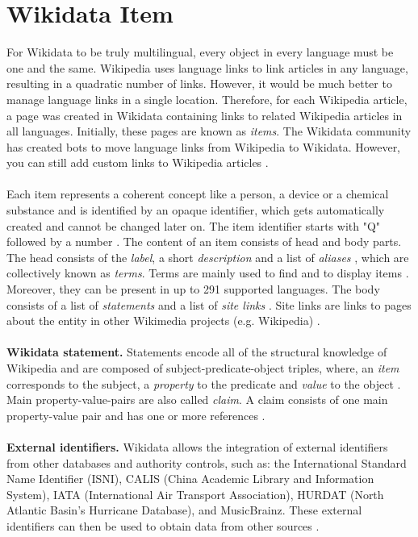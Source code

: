 ﻿\documentclass[11pt,titlepage,oneside,openany]{book}
\begin{document}
\section{Wikidata Item}
For Wikidata to be truly multilingual, every object in every language must be one and the same. Wikipedia uses language links to link articles in any language, resulting in a quadratic number of links. However, it would be much better to manage language links in a single location. Therefore, for each Wikipedia article, a page was created in Wikidata containing links to related Wikipedia articles in all languages. Initially, these pages are known as \textit{items}. The Wikidata community has created bots to move language links from Wikipedia to Wikidata. However, you can still add custom links to Wikipedia articles \cite{AFCK01}.
\\
\\
Each item represents a coherent concept like a person, a device or a chemical substance \cite{Heindorf2016VandalismDI} and is identified by an opaque identifier, which gets automatically created and cannot be changed later on. The item identifier starts with "Q" followed by a number \cite{Erxleben2014IntroducingWT}. The content of an item consists of head and body parts. The head consists of the \textit{label}, a short \textit{description} and a list of \textit{aliases} \cite{Heindorf2016VandalismDI}, which are collectively known as \textit{terms}. Terms are mainly used to find and to display items \cite{Erxleben2014IntroducingWT}. Moreover, they can be present in up to 291 supported languages. The body consists of a list of \textit{statements} and a list of \textit{site links} \cite{Heindorf2016VandalismDI}. Site links are links to pages about the entity in other Wikimedia projects (e.g. Wikipedia) \cite{Erxleben2014IntroducingWT}.
\\
\\
\textbf{Wikidata statement. } Statements encode all of the structural knowledge of Wikipedia and are composed of subject-predicate-object triples, where, an \textit{item} corresponds to the subject, a \textit{property} to the predicate and \textit{value} to the object \cite{Heindorf2016VandalismDI}. Main property-value-pairs are also called \textit{claim}. A claim consists of one main property-value pair and has one or more references \cite{Tanon2016FromFT}.
\\
\\
\textbf{External identifiers. } Wikidata allows the integration of external identifiers from other databases and authority controls, such as: the International Standard Name Identifier (ISNI), CALIS (China Academic Library and Information System), IATA (International Air Transport Association), HURDAT (North Atlantic Basin's Hurricane Database), and MusicBrainz. These external identifiers can then be used to obtain data from other sources \cite{AFCK01}.
\end{document}
